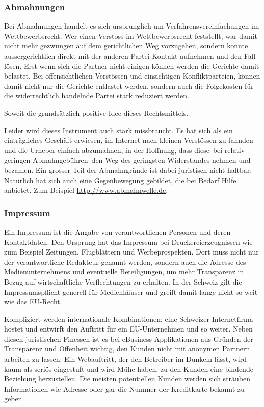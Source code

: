 \subsubsection*{Abmahnungen}

Bei Abmahnungen handelt es sich ursprünglich um Verfahrensvereinfachungen im
Wettbewerbsrecht. Wer einen Verstoss im Wettbewerbsrecht feststellt, war damit
nicht mehr gezwungen auf dem gerichtlichen Weg vorzugehen, sondern konnte
aussergerichtlich direkt mit der anderen Partei Kontakt aufnehmen und den
Fall lösen. Erst wenn sich die Partner nicht einigen können werden die
Gerichte damit belastet. Bei offensichtlichen Verstössen und einsichtigen
Konfliktparteien, können damit nicht nur die Gerichte entlastet werden, sondern
auch die Folgekosten für die widerrechtlich handelnde Partei stark reduziert
werden.

Soweit die grundsätzlich positive Idee dieses Rechtsmittels.

Leider wird dieses Instrument auch stark missbraucht. Es hat sich als ein
einträgliches Geschäft erwiesen, im Internet nach kleinen Verstössen zu
fahnden und die Urheber einfach abzumahnen, in der Hoffnung, dass diese--bei
relativ geringen Abmahngebühren--den Weg des geringsten Widerstandes nehmen
und bezahlen. Ein grosser Teil der Abmahngründe ist dabei juristisch nicht
haltbar. Natürlich hat sich auch eine Gegenbewegung gebildet, die bei Bedarf
Hilfe anbietet. Zum Beispiel \href{http://www.abmahnwelle.de}{http://www.abmahnwelle.de}.

\subsubsection*{Impressum}

Ein Impressum ist die Angabe von verantwortlichen Personen und deren Kontaktdaten.
Den Ursprung hat das Impressum bei Druckereierzeugnissen wie zum Beispiel
Zeitungen, Flugblättern und Werbeprospekten. Dort muss nicht nur der verantwortliche
Redakteur genannt werden, sondern auch die Adresse des Medienunternehmens und
eventuelle Beteiligungen, um mehr Transparenz in Bezug auf wirtschaftliche
Verflechtungen zu erhalten. In der Schweiz gilt die Impressumspflicht generell
für Medienhäuser und greift damit lange nicht so weit wie das EU-Recht.

Kompliziert werden internationale Kombinationen: eine Schweizer Internetfirma
hostet und entwirft den Auftritt für ein EU-Unternehmen und so weiter.
Neben diesen juristischen Finessen ist es bei eBusiness-Applikationen aus
Gründen der Transparenz und Offenheit wichtig, den Kunden nicht mit anonymen
Partnern arbeiten zu lassen. Ein Webauftritt, der den Betreiber im Dunkeln
lässt, wird kaum als seriös eingestuft und wird Mühe haben, zu den Kunden
eine bindende Beziehung herzustellen. Die meisten potentiellen Kunden werden
sich sträuben Informationen wie Adresse oder gar die Nummer der Kreditkarte
bekannt zu geben.


